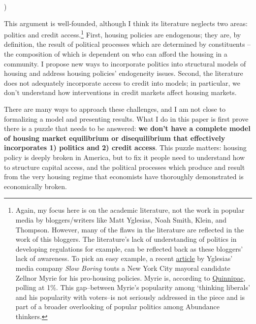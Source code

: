 )\documentclass{article}[11pt]
\begin{document}
This argument is well-founded, although I think its literature neglects two areas: politics and credit access.\footnote{Again, my focus here is on the academic literature, not the work in popular media by bloggers/writers like Matt Yglesias, Noah Smith, Klein, and Thompson. However, many of the flaws in the literature are reflected in the work of this bloggers. The literature's lack of understanding of politics in developing regulations for example, can be reflected back as these bloggers' lack of awareness. To pick an easy example, a recent \href{https://www.slowboring.com/p/new-york-city-can-do-better-than}{article} by Yglesias' media company \textit{Slow Boring} touts a New York City mayoral candidate Zellnor Myrie for his pro-housing policies. \citep{zellnor} Myrie is, according to \href{https://poll.qu.edu/images/polling/nyc/nyc03052025_nytv24.pdf}{Quinnipac}, polling at 1\%. This gap--between Myrie's popularity among `thinking liberals' and his popularity with voters--is not seriously addressed in the piece and is part of a broader overlooking of popular politics among Abundance thinkers.} First, housing policies are endogenous; they are, by definition, the result of political processes which are determined by constituents -- the composition of which is dependent on who can afford the housing in a community. I propose new ways to incorporate politics into structural models of housing and address housing policies' endogeneity issues. Second, the literature does not adequately incorporate access to credit into models; in particular, we don't understand how interventions in credit markets affect housing markets.

There are many ways to approach these challenges, and I am not close to formalizing a model and presenting results. What I do in this paper is first prove there is a puzzle that needs to be answered: \textbf{we don't have a complete model of housing market equilibrium or disequilibrium that effectively incorporates 1) politics and 2) credit access}. This puzzle matters: housing policy is deeply broken in America, but to fix it people need to understand how to structure capital access, and the political processes which produce and result from the very housing regime that economists have thoroughly demonstrated is economically broken. 
\end{document}
